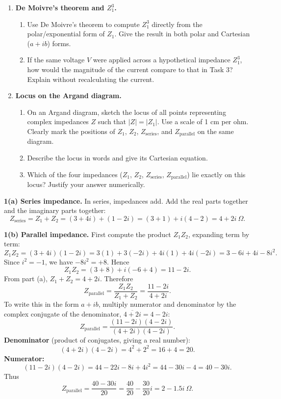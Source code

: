 \documentclass[11pt]{article}
\newcounter{popsec}
\newcounter{popsub}
\newcommand{\courssub}[1]{%
  \stepcounter{popsub}%
  \par\vspace{9pt}\noindent{\popxbold\fontsize{11.5}{13}\selectfont\color{popink}{\color{poporange}\thepopsec.\thepopsub}\hspace{6pt}#1}\par\nopagebreak\vspace{4pt}
}
\begin{document}
\begin{enumerate}
    \item \textbf{De Moivre's theorem and $Z_1^3$.}
    \begin{enumerate}
        \item Use De Moivre's theorem to compute $Z_1^3$ directly from the polar/exponential form of $Z_1$. Give the result in both polar and Cartesian ($a+ib$) forms.
        \item If the same voltage $V$ were applied across a hypothetical impedance $Z_1^3$, how would the magnitude of the current compare to that in Task 3? Explain without recalculating the current.
    \end{enumerate}

    \item \textbf{Locus on the Argand diagram.}
    \begin{enumerate}
        \item On an Argand diagram, sketch the locus of all points representing complex impedances $Z$ such that $|Z| = |Z_1|$. Use a scale of 1 cm per ohm. Clearly mark the positions of $Z_1$, $Z_2$, $Z_{\text{series}}$, and $Z_{\text{parallel}}$ on the same diagram.
        \item Describe the locus in words and give its Cartesian equation.
        \item Which of the four impedances ($Z_1$, $Z_2$, $Z_{\text{series}}$, $Z_{\text{parallel}}$) lie exactly on this locus? Justify your answer numerically.
    \end{enumerate}
\end{enumerate}

\courssub{Model answer}

\begin{exoresolu}
\textbf{1(a) Series impedance.} In series, impedances add. Add the real parts together and the imaginary parts together:
\[
Z_{\text{series}} = Z_1 + Z_2 = (3+4i) + (1-2i) = (3+1) + i(4-2) = 4 + 2i\ \Omega.
\]

\textbf{1(b) Parallel impedance.}
First compute the product $Z_1 Z_2$, expanding term by term:
\[
Z_1 Z_2 = (3+4i)(1-2i) = 3(1) + 3(-2i) + 4i(1) + 4i(-2i) = 3 - 6i + 4i - 8i^2.
\]
Since $i^2 = -1$, we have $-8i^2 = +8$. Hence
\[
Z_1 Z_2 = (3+8) + i(-6+4) = 11 - 2i.
\]
From part (a), $Z_1 + Z_2 = 4 + 2i$. Therefore
\[
Z_{\text{parallel}} = \frac{Z_1 Z_2}{Z_1 + Z_2} = \frac{11 - 2i}{4 + 2i}.
\]
To write this in the form $a+ib$, multiply numerator and denominator by the complex conjugate of the denominator, $\overline{4+2i} = 4 - 2i$:
\[
Z_{\text{parallel}} = \frac{(11 - 2i)(4 - 2i)}{(4 + 2i)(4 - 2i)}.
\]
\textbf{Denominator} (product of conjugates, giving a real number):
\[
(4+2i)(4-2i) = 4^2 + 2^2 = 16 + 4 = 20.
\]
\textbf{Numerator:}
\[
(11-2i)(4-2i) = 44 - 22i - 8i + 4i^2 = 44 - 30i - 4 = 40 - 30i.
\]
Thus
\[
Z_{\text{parallel}} = \frac{40 - 30i}{20} = \frac{40}{20} - \frac{30}{20}i = 2 - 1.5i\ \Omega.
\]
\end{exoresolu}
\end{document}
